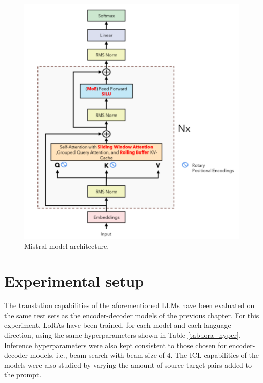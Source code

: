 \documentclass[11pt,english,listoffigures,listoftables]{tfgetsinf}
\begin{document}
\begin{figure}[h]
    \centering
    \includegraphics[width=0.5\linewidth]{figures/mistral.pdf}
    \caption{Mistral model architecture.\protect\footnotemark}
    \label{fig:mistral}
\end{figure}



\section{Experimental setup}

The translation capabilities of the aforementioned LLMs have been evaluated on the same test sets as the encoder-decoder models of the previous chapter. For this experiment, LoRAs have been trained, for each model and each language direction, using the same hyperparameters shown in Table \ref{tab:lora_hyper}. Inference hyperparameters were also kept consistent to those chosen for encoder-decoder models, i.e., beam search with beam size of 4. The ICL capabilities of the models were also studied by varying the amount of source-target pairs added to the prompt. 

\end{document}
